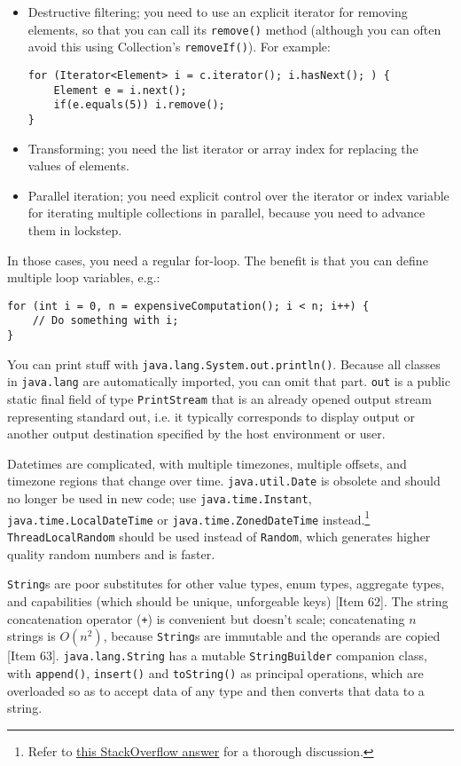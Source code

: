 \documentclass[8pt, table, xcdraw]{article}%
\begin{document}
\begin{itemize}
    \item Destructive filtering; you need to use an explicit iterator for removing elements, so that you can call its \lstinline{remove()} method (although you can often avoid this using Collection’s \lstinline{removeIf()}). For example:

    \begin{lstlisting}
for (Iterator<Element> i = c.iterator(); i.hasNext(); ) {
    Element e = i.next();
    if(e.equals(5)) i.remove();
}
    \end{lstlisting}
    \item Transforming; you need the list iterator or array index for replacing the values of elements.
    \item Parallel iteration; you need explicit control over the iterator or index variable for iterating multiple collections in parallel, because you need to advance them in lockstep.
\end{itemize}

In those cases, you need a regular for-loop. The benefit is that you can define multiple loop variables, e.g.:

\begin{lstlisting}
for (int i = 0, n = expensiveComputation(); i < n; i++) {
    // Do something with i;
}
\end{lstlisting}

You can print stuff with \lstinline{java.lang.System.out.println()}. Because all classes in \lstinline{java.lang} are automatically imported, you can omit that part. \lstinline{out} is a public static final field of type \lstinline{PrintStream} that is an already opened output stream representing standard out, i.e. it typically corresponds to display output or another output destination specified by the host environment or user.

Datetimes are complicated, with multiple timezones, multiple offsets, and timezone regions that change over time. \lstinline{java.util.Date} is obsolete and should no longer be used in new code; use \lstinline{java.time.Instant}, \lstinline{java.time.LocalDateTime} or \lstinline{java.time.ZonedDateTime} instead.\footnote{Refer to \href{https://stackoverflow.com/a/56508200}{this StackOverflow answer} for a thorough discussion.} \lstinline{ThreadLocalRandom} should be used instead of \lstinline{Random}, which generates higher quality random numbers and is faster.

\lstinline{String}s are poor substitutes for other value types, enum types, aggregate types, and capabilities (which should be unique, unforgeable keys) [Item 62]. The string concatenation operator (\lstinline{+}) is convenient but doesn't scale; concatenating $n$ strings is $O(n^2)$, because \lstinline{String}s are immutable and the operands are copied [Item 63]. \lstinline{java.lang.String} has a mutable \lstinline{StringBuilder} companion class, with \lstinline{append()}, \lstinline{insert()} and \lstinline{toString()} as principal operations, which are overloaded so as to accept data of any type and then converts that data to a string.
\end{document}
